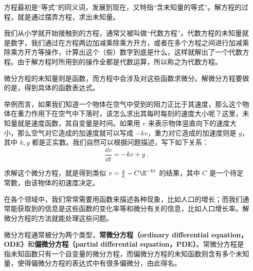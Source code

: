 

方程最初是“等式”的同义词，发展到现在，又特指“含未知量的等式”。解方程的过程，就是通过摆弄方程，求出未知量。

我们从小学就开始接触到的方程，通常又被叫做“代数方程”。代数方程的未知量就是数字，我们通过在方程两边加减乘除乘方开方，或者在多个方程之间进行加减乘除乘方开方等操作，计算出这个（些）数字到底是什么，这样就解出了一个代数方程。由于解方程时所用到的操作全都是代数运算，所以称之为代数方程。

微分方程的未知量则是函数，而方程中会涉及对这些函数求微分。解微分方程要做的是，得到具体的函数表达式。

举例而言，如果我们知道一个物体在空气中受到的阻力正比于其速度，那么这个物体在重力作用下在空气中下落时，该怎么求出其每时每刻的速度大小呢？这里，未知量就是速度函数，其自变量是时间。如果用 $v$ 来表示物体竖直向下的速度大小，那么空气对它造成的加速度就可以写成 $-kv$，重力对它造成的加速度则是 $g$，其中 $k, g$ 都是正实数。我们自然可以根据问题描述，写下如下关系：
\begin{equation}
\frac{\dd v}{\dd t}=-kv+g~.
\end{equation}

求解这个微分方程，就是得到类似 $v=\frac{g}{k}- C\E^{-kt}$ 的结果，其中 $C$ 是一个待定常数，由该物体的初速度决定。

在各个领域中，我们常常需要用函数来描述各种现象，比如人口的增长；而我们通常能获取到的信息是这些函数的变化率等和微分有关的信息，比如人口增长率。解微分方程的方法就能处理这些问题。

微分方程通常被分为两个类型，\textbf{常微分方程（ordinary differential equation，ODE）}和\textbf{偏微分方程（partial differential equation，PDE）}。常微分方程是指未知函数只有一个自变量的微分方程，而偏微分方程的未知函数则含有多个未知量，使得偏微分方程的表达式中有很多偏微分，由此得名。


















